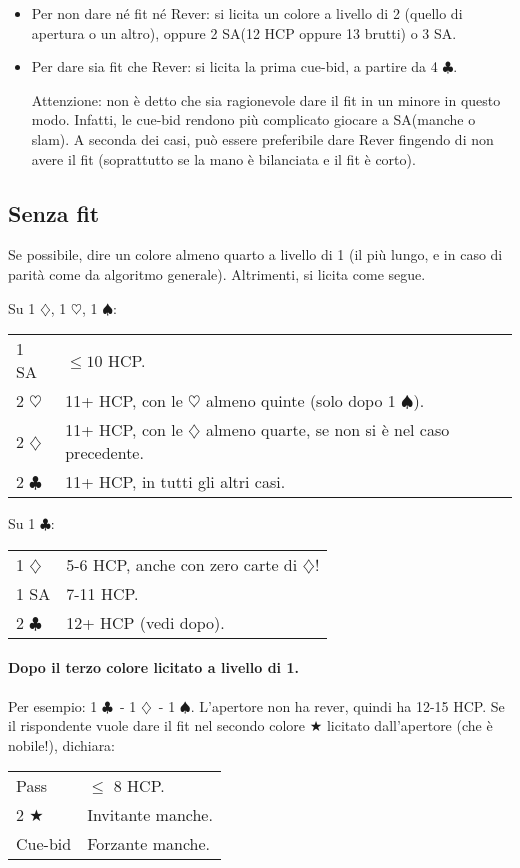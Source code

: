 \documentclass[a4paper,10pt]{article}
\renewcommand{\c}{$\clubsuit$\xspace}
\renewcommand{\d}{$\diamondsuit$\xspace}
\newcommand{\h}{$\heartsuit$\xspace}
\newcommand{\s}{$\spadesuit$\xspace}
\renewcommand{\j}{$\bigstar$\xspace}
\newcommand{\sa}{SA\xspace}
\newcommand{\smallspace}{\vskip0.3cm}
\newenvironment{twocol}
  {\smallspace\noindent\begin{tabular}{l p{0.78\textwidth}}}
  {\end{tabular}\smallspace}
\begin{document}
\begin{itemize}
\begin{itemize}
  \item Per non dare né fit né Rever: si licita un colore a livello di 2 (quello di apertura o un altro), oppure 2 \sa (12 HCP oppure 13 brutti) o 3 \sa.
  
  \item Per dare sia fit che Rever: si licita la prima cue-bid, a partire da 4 \c.
  
  Attenzione: non è detto che sia ragionevole dare il fit in un minore in questo modo. Infatti, le cue-bid rendono più complicato giocare a \sa (manche o slam). A seconda dei casi, può essere preferibile dare Rever fingendo di non avere il fit (soprattutto se la mano è bilanciata e il fit è corto).
 \end{itemize}

\end{itemize}


\subsection{Senza fit}


Se possibile, dire un colore almeno quarto a livello di 1 (il più lungo, e in caso di parità come da algoritmo generale). Altrimenti, si licita come segue.

Su 1 \d, 1 \h, 1 \s:
\begin{twocol}
	1 \sa & $\leq 10$ HCP.\\
	2 \h & 11+ HCP, con le \h almeno quinte (solo dopo 1 \s).\\
	2 \d & 11+ HCP, con le \d almeno quarte, se non si è nel caso precedente.\\
	2 \c & 11+ HCP, in tutti gli altri casi.\\
\end{twocol}

Su 1 \c:
\begin{twocol}
	1 \d & 5-6 HCP, anche con zero carte di \d! \\
	1 \sa & 7-11 HCP. \\
	2 \c & 12+ HCP (vedi dopo). \\
\end{twocol}


\paragraph{Dopo il terzo colore licitato a livello di 1.} Per esempio: 1 \c\ - 1 \d\ - 1 \s.
L'apertore non ha rever, quindi ha 12-15 HCP.
Se il rispondente vuole dare il fit nel secondo colore \j licitato dall'apertore (che è nobile!), dichiara:
\begin{twocol}
	Pass & $\leq$ 8 HCP.\\
	2 \j  & Invitante manche.\\
	Cue-bid  & Forzante manche.\\
\end{twocol}
\end{document}
